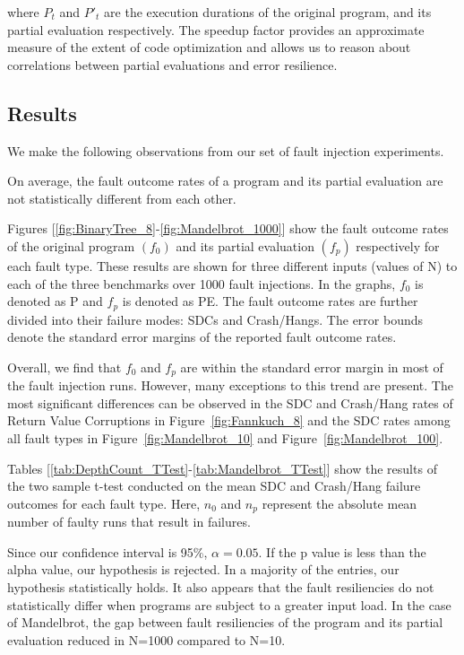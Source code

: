where $P_t$ and $P'_t$ are the execution durations of the original program, and its partial evaluation respectively.
The speedup factor provides an approximate measure of the extent of code optimization and allows us to reason about correlations between partial evaluations and error resilience.


\subsection{Results}
\label{sec:results}

We make the following observations from our set of fault injection experiments.

\begin{obs}
  \label{obs:faultoutcomes}
  On average, the fault outcome rates of a program and its partial evaluation are not statistically different from each other.
\end{obs}

Figures [\ref{fig:BinaryTree_8}-\ref{fig:Mandelbrot_1000}] show the fault outcome rates of the original program $(f_0)$ and its partial evaluation $(f_p)$ respectively for each fault type.
These results are shown for three different inputs (values of N) to each of the three benchmarks over 1000 fault injections.  
In the graphs, $f_0$ is denoted as P and $f_p$ is denoted as PE.
The fault outcome rates are further divided into their failure modes: SDCs and Crash/Hangs.
The error bounds denote the standard error margins of the reported fault outcome rates.

Overall, we find that $f_0$ and $f_p$ are within the standard error margin in most of the fault injection runs.
However, many exceptions to this trend are present.
The most significant differences can be observed in the SDC and Crash/Hang rates of Return Value Corruptions in Figure~\ref{fig:Fannkuch_8} and the SDC rates among all fault types in Figure~\ref{fig:Mandelbrot_10} and Figure~\ref{fig:Mandelbrot_100}.

Tables [\ref{tab:DepthCount_TTest}-\ref{tab:Mandelbrot_TTest}] show the results of the two sample t-test conducted on the mean SDC and Crash/Hang failure outcomes for each fault type.
Here, $n_0$ and $n_p$ represent the absolute mean number of faulty runs that result in failures. 

Since our confidence interval is 95\%, $\alpha=0.05$.
If the p value is less than the alpha value, our hypothesis is rejected.
In a majority of the entries, our hypothesis statistically holds.
It also appears that the fault resiliencies do not statistically differ when programs are subject to a greater input load.
In the case of Mandelbrot, the gap between fault resiliencies of the program and its partial evaluation reduced in N=1000 compared to N=10.

